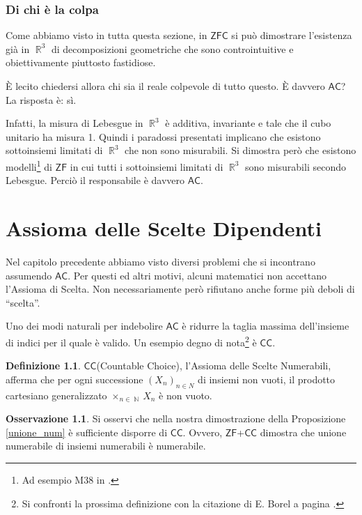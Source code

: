 \documentclass[12pt,a4paper]{report}
\theoremstyle{definition}
\newtheorem{defn}[teo]{Definizione}  %
\newtheorem{oss}[teo]{Osservazione}  %
\theoremstyle{num.custom-title}
\DeclareMathOperator{\N}{\mathbb{N}}
\DeclareMathOperator{\R}{\mathbb{R}}
\newcommand{\AC}{\ensuremath{\mathsf{AC}}\xspace}
\newcommand{\CC}{\ensuremath{\mathsf{CC}}\xspace}
\newcommand{\ZF}{\ensuremath{\mathsf{ZF}}\xspace}
\newcommand{\ZFC}{\ensuremath{\mathsf{ZFC}}\xspace}
\begin{document}
\subsection{Di chi è la colpa}

Come abbiamo visto in tutta questa sezione, in \ZFC si può dimostrare l'esistenza già in $\R^3$ di decomposizioni geometriche che sono controintuitive e obiettivamente piuttosto fastidiose.

È lecito chiedersi allora chi sia il reale colpevole di tutto questo. È davvero \AC? La risposta è: sì.

Infatti, la misura di Lebesgue in $\R^3$ è additiva, invariante e tale che il cubo unitario ha misura 1. Quindi i paradossi presentati implicano che esistono sottoinsiemi limitati di $\R^3$ che non sono misurabili. Si dimostra però che esistono modelli\footnote{Ad esempio M38 in \cite{HoRu98:Herrlich}.} di \ZF in cui tutti i sottoinsiemi limitati di $\R^3$ sono misurabili secondo Lebesgue. Perciò il responsabile è davvero \AC.



\chapter{Assioma delle Scelte Dipendenti}


Nel capitolo precedente abbiamo visto diversi problemi che si incontrano assumendo \AC. Per questi ed altri motivi, alcuni matematici non accettano l'Assioma di Scelta. Non necessariamente però rifiutano anche forme più deboli di ``scelta''.

Uno dei modi naturali per indebolire \AC è ridurre la taglia massima dell'insieme di indici per il quale è valido.  Un esempio degno di nota\footnote{Si confronti la prossima definizione con la citazione di E. Borel a pagina \pageref{cit_borel}.} è \CC.

\begin{defn}
\CC (Countable Choice), l'Assioma delle Scelte Numerabili, afferma che per ogni successione $(X_n)_{n \in N}$ di insiemi non vuoti, il prodotto cartesiano generalizzato $\times_{n \in \N} X_n$ è non vuoto.
\end{defn}

\begin{oss}\label{oss_cc_unione_num}
Si osservi che nella nostra dimostrazione della Proposizione \ref{unione_num} è sufficiente disporre di \CC. Ovvero, \ZF+\CC dimostra che unione numerabile di insiemi numerabili è numerabile.
\end{oss}
\end{document}
